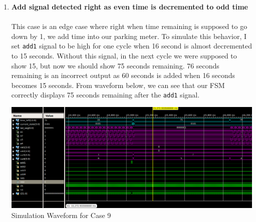\documentclass{article}
\begin{document}
\begin{enumerate}
\begin{center}
        \caption{Simulation Waveform for Case 8}
    \end{center}
    \item \textbf{Add signal detected right as even time is decremented to odd time} \\ \\
    This case is an edge case where right when time remaining is supposed to go down by 1, we add time into our parking meter. To simulate this behavior, I set \texttt{add1} signal to be high for one cycle when 16 second is almost decremented to 15 seconds. Without this signal, in the next cycle we were supposed to show 15, but now we should show 75 seconds remaining. 76 seconds remaining is an incorrect output as 60 seconds is added when 16 seconds becomes 15 seconds. From waveform below, we can see that our FSM correctly displays 75 seconds remaining after the \texttt{add1} signal. 
    \begin{center}
        \includegraphics[scale=0.35]{waveform-9.png} \\
        \caption{Simulation Waveform for Case 9}
    \end{center}
    

\end{enumerate}
\end{document}
